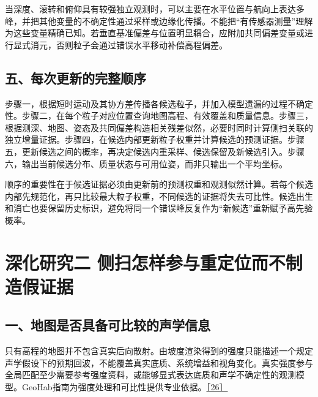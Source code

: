 当深度、滚转和俯仰具有较强独立观测时，可以主要在水平位置与航向上表达多峰，并把其他变量的不确定性通过采样或边缘化传播。不能把``有传感器测量''理解为这些变量精确已知。若垂直基准偏差与位置明显耦合，应附加共同偏差变量或进行显式消元，否则粒子会通过错误水平移动补偿高程偏差。

\hypertarget{ux4e94ux6bcfux6b21ux66f4ux65b0ux7684ux5b8cux6574ux987aux5e8f}{%
\subsection{五、每次更新的完整顺序}\label{ux4e94ux6bcfux6b21ux66f4ux65b0ux7684ux5b8cux6574ux987aux5e8f}}

步骤一，根据短时运动及其协方差传播各候选粒子，并加入模型遗漏的过程不确定性。步骤二，在每个粒子对应位置查询地图高程、有效覆盖和质量信息。步骤三，根据测深、地图、姿态及共同偏差构造相关残差似然，必要时同时计算侧扫关联的独立增量证据。步骤四，在候选内部更新粒子权重并计算候选的预测证据。步骤五，更新候选之间的概率，再决定候选内重采样、候选保留及新候选引入。步骤六，输出当前候选分布、质量状态与可用位姿，而非只输出一个平均坐标。

顺序的重要性在于候选证据必须由更新前的预测权重和观测似然计算。若每个候选内部先规范化，再只比较最大粒子权重，不同候选的证据将失去可比性。候选出生和消亡也要保留历史标识，避免将同一个错误峰反复作为``新候选''重新赋予高先验概率。

\hypertarget{ux6df1ux5316ux7814ux7a76ux4e8c-ux4fa7ux626bux600eux6837ux53c2ux4e0eux91cdux5b9aux4f4dux800cux4e0dux5236ux9020ux5047ux8bc1ux636e}{%
\section{深化研究二 侧扫怎样参与重定位而不制造假证据}\label{ux6df1ux5316ux7814ux7a76ux4e8c-ux4fa7ux626bux600eux6837ux53c2ux4e0eux91cdux5b9aux4f4dux800cux4e0dux5236ux9020ux5047ux8bc1ux636e}}

\hypertarget{ux4e00ux5730ux56feux662fux5426ux5177ux5907ux53efux6bd4ux8f83ux7684ux58f0ux5b66ux4fe1ux606f}{%
\subsection{一、地图是否具备可比较的声学信息}\label{ux4e00ux5730ux56feux662fux5426ux5177ux5907ux53efux6bd4ux8f83ux7684ux58f0ux5b66ux4fe1ux606f}}

只有高程的地图并不包含真实后向散射。由坡度渲染得到的强度只能描述一个规定声学假设下的预期回波，不能覆盖真实底质、系统增益和视角变化。真实强度参与全局匹配至少需要参考强度资料，或能够显式表达底质和声学不确定性的观测模型。GeoHab指南为强度处理和可比性提供专业依据。\href{https://geohab.org/backscatter-working-group/}{［26］}

